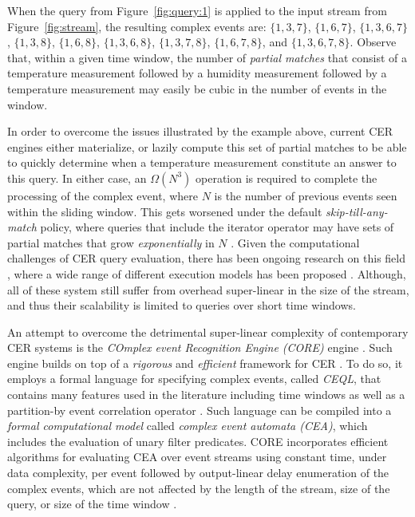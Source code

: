 \begin{example}
When the query from Figure~\ref{fig:query:1} is applied to the input stream from Figure~\ref{fig:stream}, the resulting complex events are: $\{ 1, 3, 7 \}$, $\{ 1, 6, 7 \}$, $\{ 1, 3, 6, 7 \}$, $\{ 1, 3, 8 \}$, $\{ 1, 6, 8 \}$, $\{ 1, 3, 6, 8 \}$, $\{ 1, 3, 7, 8\}$, $\{ 1, 6, 7, 8\}$, and $\{ 1, 3, 6, 7, 8\}$. Observe that, within a given time window, the number of \emph{partial matches} that consist of a temperature measurement followed by a humidity measurement followed by a temperature measurement may easily be cubic in the number of events in the window.
\end{example}

In order to overcome the issues illustrated by the example above, current CER engines either materialize, or lazily compute this set of partial matches to be able to quickly determine when a temperature measurement constitute an answer to this query. In either case, an $\Omega(N^{3})$ operation is required to complete the processing of the complex event, where $N$ is the number of previous events seen within the sliding window. This gets worsened under the default \emph{skip-till-any-match} \cite{skip-till-any-match} policy, where queries that include the iterator operator may have sets of partial matches that grow \emph{exponentially} in $N$ \cite{core}.  Given the computational challenges of CER query evaluation, there has been ongoing research on this field \cite{research-evaluation-query, formal-framework-cer}, where a wide range of different execution models has been proposed \cite{survey-systems-1, survey-systems-2}. Although, all of these system still suffer from overhead super-linear in the size of the stream, and thus their scalability is limited to queries over short time windows.

An attempt to overcome the detrimental super-linear complexity of contemporary CER systems is the \emph{COmplex event Recognition Engine (CORE)} engine \cite{core}. Such engine builds on top of a \emph{rigorous} and \emph{efficient} framework for CER \cite{formal-framework-cep, formal-framework-cer}. To do so, it employs a formal language for specifying complex events, called \emph{CEQL}, that contains many features used in the literature including time windows as well as a partition-by event correlation operator \cite{on-the-expressiveness, core}. Such language can be compiled into a \emph{formal computational model} called \emph{complex event automata (CEA)}, which includes the evaluation of unary filter predicates. CORE incorporates efficient algorithms for evaluating CEA over event streams using constant time, under data complexity, per event followed by output-linear delay enumeration of the complex events, which are not affected by the length of the stream, size of the query, or size of the time window \cite{formal-framework-cer, core}.

